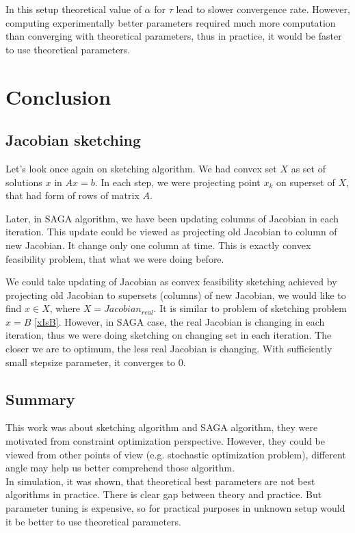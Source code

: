 \documentclass[11pt]{book}
\begin{document}
In this setup theoretical value of $\alpha$ for $\tau$ lead to slower convergence rate. However, computing experimentally better parameters required much more computation than converging with theoretical parameters, thus in practice, it would be faster to use theoretical parameters.

\chapter{Conclusion}

\section{Jacobian sketching}

Let's look once again on sketching algorithm. We had convex set $X$ as set of solutions $x$ in $Ax=b$. In each step, we were projecting point $x_k$ on superset of $X$, that had form of rows of matrix $A$.

Later, in SAGA algorithm, we have been updating columns of Jacobian in each iteration. This update could be viewed as projecting old Jacobian to column of new Jacobian. It change only one column at time. This is exactly convex feasibility problem, that what we were doing before.

We could take updating of Jacobian as convex feasibility sketching achieved by projecting old Jacobian to supersets (columns) of new Jacobian, we would like to find $x \in X$, where $X=Jacobian_{real}$. It is similar to problem of sketching problem $x=B$ \ref{xIsB}. However, in SAGA case, the real Jacobian is changing in each iteration, thus we were doing sketching on changing set in each iteration. The closer we are to optimum, the less real Jacobian is changing. With sufficiently small stepsize parameter, it converges to $0$.


\section{Summary}
This work was about sketching algorithm and SAGA algorithm, they were motivated from constraint optimization perspective. However, they could be viewed from other points of view (e.g. stochastic optimization problem), different angle may help us better comprehend those algorithm.\\

In simulation, it was shown, that theoretical best parameters are not best algorithms in practice. There is clear gap between theory and practice. But parameter tuning is expensive, so for practical purposes in unknown setup would it be better to use theoretical parameters.
\end{document}
